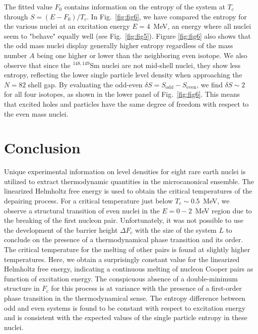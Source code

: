 \begin{multicols}{2}
The fitted value $F_0$ contains information on the entropy of the system at 
$T_c$ through $S=(E-F_0)/T_c$. In Fig.\ \ref{fig:fig6}, we have compared the 
entropy for the various nuclei at an excitation energy $E=4$~MeV, an energy 
where all nuclei seem to "behave" equally well (see Fig.\ \ref{fig:fig5}). 
Figure \ref{fig:fig6} also shows that the odd mass nuclei display generally 
higher entropy regardless of the mass number $A$ being one higher or lower than
the neighboring even isotope. We also observe that since the $^{148,149}$Sm 
nuclei are not mid-shell nuclei, they show less entropy, reflecting the lower 
single particle level density when approaching the $N=82$ shell gap. By 
evaluating the odd-even $\delta S=S_{\mathrm{odd}}-S_{\mathrm{even}}$, we find 
$\delta S\sim 2$ for all four isotopes, as shown in the lower panel of Fig.\ 
\ref{fig:fig6}. This means that excited holes and particles have the same 
degree of freedom with respect to the even mass nuclei.

\section{Conclusion}

Unique experimental information on level densities for eight rare earth nuclei 
is utilized to extract thermodynamic quantities in the microcanonical ensemble.
The linearized Helmholtz free energy is used to obtain the critical 
temperatures of the depairing process. For a critical temperature just below 
$T_c\sim 0.5$~MeV, we observe a structural transition of even nuclei in the 
$E=0-2$~MeV region due to the breaking of the first nucleon pair. 
Unfortunately, it was not possible to use the development of the barrier height
$\Delta F_c$ with the size of the system $L$ to conclude on the presence of a
thermodynamical phase transition and its order. The critical temperature for 
the melting of other pairs is found at slightly higher temperatures. Here, we 
obtain a surprisingly constant value for the linearized Helmholtz free energy, 
indicating a continuous melting of nucleon Cooper pairs as function of 
excitation energy. The conspicuous absence of a double-minimum structure in 
$F_c$ for this process is at variance with the presence of a first-order phase 
transition in the thermodynamical sense. The entropy difference between odd and
even systems is found to be constant with respect to excitation energy and is 
consistent with the expected values of the single particle entropy in these 
nuclei.


\end{multicols}
